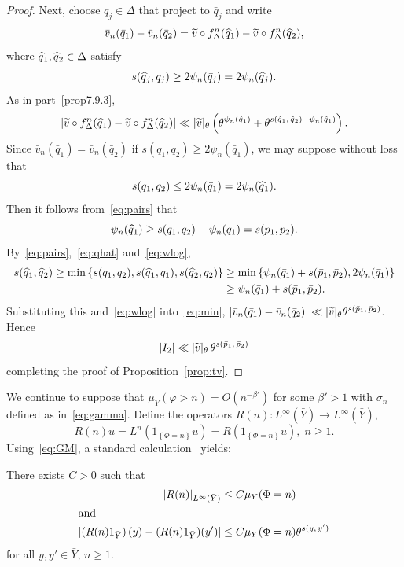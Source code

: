 \documentclass[AHL,Unicode,longabstracts,published]{cedram}
\newcommand{\tv}{\tilde{v}}
\newcommand{\bY}{\bar{Y}}
\let\oldtilde\tilde
\renewcommand*{\tilde}[1]{\mathchoice{\widetilde{#1}}{\widetilde{#1}}{\oldtilde{#1}}{\oldtilde{#1}}}
\let\oldhat\hat
\renewcommand*{\hat}[1]{\mathchoice{\widehat{#1}}{\widehat{#1}}{\oldhat{#1}}{\oldhat{#1}}}
\begin{document}
\begin{proof}
Next, choose $q_j\in\Delta$ that project to $\bar q_j$ and write
\[
\bar v_n(\bar q_1)-\bar v_n(\bar q_2)=
\tv\circ f_\Delta^n(\hat q_1)-\tv\circ f_\Delta^n(\hat q_2),
\]
where $\hat q_1,\hat q_2\in\Delta$ satisfy
\begin{equation}\label{eq:qhat}
s(\hat q_j,q_j)\ge 2\psi_n(\bar q_j) =2\psi_n(\hat q_j).
\end{equation}
As in part~\eqref{prop7.9.3},
\begin{equation}\label{eq:min}
\left|\tv\circ f_\Delta^n(\hat q_1)-\tv\circ f_\Delta^n(\hat q_2)\right|
\ll |\tv|_\theta \left(\theta^{\psi_n(\hat q_1)} +\theta^{s(\hat q_1,\,\hat q_2)-\psi_n(\hat q_1)}\right).
\end{equation}
Since $\bar v_n(\bar q_1)=\bar v_n(\bar q_2)$ if $s(q_1,q_2)\ge 2\psi_n(\bar q_1)$, we may suppose without loss that
\[
s(q_1,q_2)\le 2\psi_n(\bar q_1)=2\psi_n(\hat q_1).
\]
Then it follows from~\eqref{eq:pairs} that
\begin{equation}\label{eq:wlog}
\psi_n(\hat q_1)\ge s(q_1,q_2)-\psi_n(\bar q_1) =s(\bar p_1,\bar p_2).
\end{equation}
By~\eqref{eq:pairs},~\eqref{eq:qhat} and~\eqref{eq:wlog},
\begin{align*}
s(\hat q_1,\hat q_2)
\ge \min\left\{s(q_1,q_2),s(\hat q_1,q_1),s(\hat q_2,q_2)\right\} & \ge \min\left\{\psi_n(\bar q_1)+s(\bar p_1,\bar p_2),2\psi_n(\bar q_1)\right\}
\\ & \ge \psi_n(\bar q_1)+s(\bar p_1,\bar p_2).
\end{align*}
Substituting this and~\eqref{eq:wlog} into~\eqref{eq:min}, $|\bar v_n(\bar q_1)-\bar v_n(\bar q_2)|
\ll |\tv|_\theta \theta^{s(\bar p_1,\,\bar p_2)}$. Hence
\[
|I_2|\ll |\tv|_\theta\, \theta^{s(\bar p_1,\,\bar p_2)}
\]
completing the proof of Proposition~\ref{prop:tv}.
\end{proof}

We continue to suppose that $\mu_Y(\varphi>n)=O(n^{-\beta'})$ for some $\beta'>1$ with $\sigma_n$ defined as in~\eqref{eq:gamma}. Define the operators $R(n):L^\infty(\bY)\to L^\infty(\bY)$,
\[
R(n)u=L^n\left(1_{\left\{\Phi=n\right\}}u\right)=R\left(1_{\left\{\Phi=n\right\}}u\right),\;n\ge1.
\]
Using~\eqref{eq:GM}, a standard calculation~\cite{Gouezel04a,Sarig02} yields:

\begin{prop}\label{prop:GS}
There exists $C>0$ such that
\begin{align*}
|R(n)|_{L^\infty(\bY)} &\le C \mu_Y(\Phi=n)\\
\intertext{and}
\left|\left(R(n)1_{\bY}\right)(y)- (R(n)1_{\bY})(y')\right| &\le C \mu_Y(\Phi=n) \theta^{s(y,\,y')}
\end{align*}
for all $y,y'\in \bY$, $n\ge1$.
\end{prop}
\end{document}
